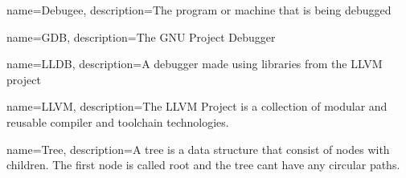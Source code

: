 {
    name=Debugee,
    description={The program or machine that is being debugged}
}

{
    name=GDB,
    description={The GNU Project Debugger}
}

{
    name=LLDB,
    description={A debugger made using libraries from the LLVM project}
}

{
    name=LLVM,
    description={The LLVM Project is a collection of modular and reusable compiler and toolchain technologies.}
}

{
    name=Tree,
    description={A tree is a data structure that consist of nodes with children. The first node is called root and the tree cant have any circular paths.}
}








